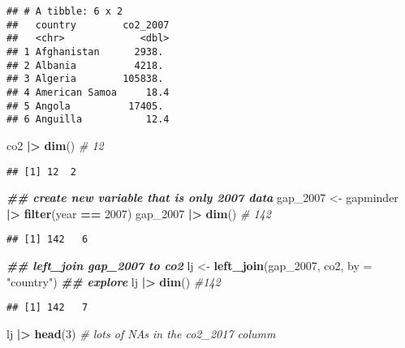 \documentclass[
]{article}
\newenvironment{Shaded}{\begin{snugshade}}{\end{snugshade}}
\newcommand{\AttributeTok}[1]{\textcolor[rgb]{0.13,0.29,0.53}{#1}}
\newcommand{\CommentTok}[1]{\textcolor[rgb]{0.56,0.35,0.01}{\textit{#1}}}
\newcommand{\DecValTok}[1]{\textcolor[rgb]{0.00,0.00,0.81}{#1}}
\newcommand{\DocumentationTok}[1]{\textcolor[rgb]{0.56,0.35,0.01}{\textbf{\textit{#1}}}}
\newcommand{\FunctionTok}[1]{\textcolor[rgb]{0.13,0.29,0.53}{\textbf{#1}}}
\newcommand{\NormalTok}[1]{#1}
\newcommand{\OtherTok}[1]{\textcolor[rgb]{0.56,0.35,0.01}{#1}}
\newcommand{\SpecialCharTok}[1]{\textcolor[rgb]{0.81,0.36,0.00}{\textbf{#1}}}
\newcommand{\StringTok}[1]{\textcolor[rgb]{0.31,0.60,0.02}{#1}}
\begin{document}
\begin{verbatim}
## # A tibble: 6 x 2
##   country        co2_2007
##   <chr>             <dbl>
## 1 Afghanistan      2938. 
## 2 Albania          4218. 
## 3 Algeria        105838. 
## 4 American Samoa     18.4
## 5 Angola          17405. 
## 6 Anguilla           12.4
\end{verbatim}

\begin{Shaded}
\begin{Highlighting}[]
\NormalTok{co2 }\SpecialCharTok{|\textgreater{}} \FunctionTok{dim}\NormalTok{() }\CommentTok{\# 12}
\end{Highlighting}
\end{Shaded}

\begin{verbatim}
## [1] 12  2
\end{verbatim}

\begin{Shaded}
\begin{Highlighting}[]
\DocumentationTok{\#\# create new variable that is only 2007 data}
\NormalTok{gap\_2007 }\OtherTok{\textless{}{-}}\NormalTok{ gapminder }\SpecialCharTok{|\textgreater{}}
\FunctionTok{filter}\NormalTok{(year }\SpecialCharTok{==} \DecValTok{2007}\NormalTok{)}
\NormalTok{gap\_2007 }\SpecialCharTok{|\textgreater{}} \FunctionTok{dim}\NormalTok{() }\CommentTok{\# 142}
\end{Highlighting}
\end{Shaded}

\begin{verbatim}
## [1] 142   6
\end{verbatim}

\begin{Shaded}
\begin{Highlighting}[]
\DocumentationTok{\#\# left\_join gap\_2007 to co2}
\NormalTok{lj }\OtherTok{\textless{}{-}} \FunctionTok{left\_join}\NormalTok{(gap\_2007, co2, }\AttributeTok{by =} \StringTok{"country"}\NormalTok{)}
\DocumentationTok{\#\# explore}
\NormalTok{lj }\SpecialCharTok{|\textgreater{}} \FunctionTok{dim}\NormalTok{() }\CommentTok{\#142}
\end{Highlighting}
\end{Shaded}

\begin{verbatim}
## [1] 142   7
\end{verbatim}

\begin{Shaded}
\begin{Highlighting}[]
\NormalTok{lj }\SpecialCharTok{|\textgreater{}} \FunctionTok{head}\NormalTok{(}\DecValTok{3}\NormalTok{) }\CommentTok{\# lots of NAs in the co2\_2017 columm}
\end{Highlighting}
\end{Shaded}
\end{document}
